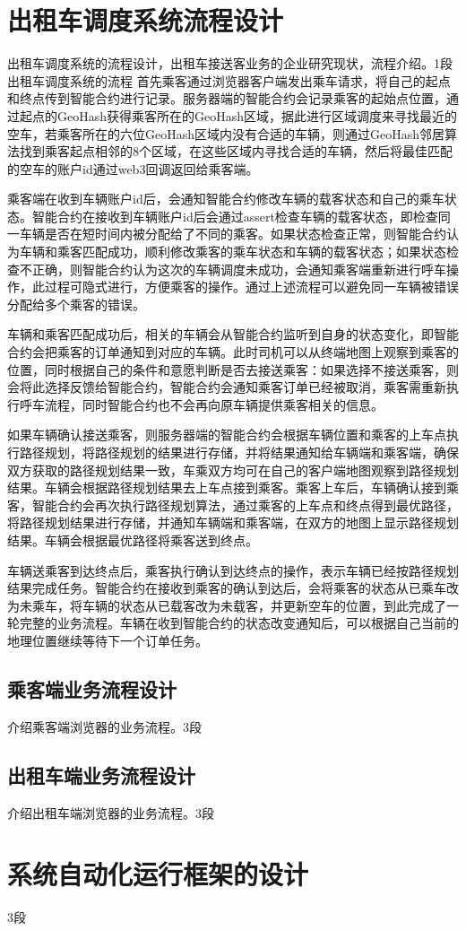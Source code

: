 \section{出租车调度系统流程设计}
出租车调度系统的流程设计，出租车接送客业务的企业研究现状，流程介绍。1段
出租车调度系统的流程
首先乘客通过浏览器客户端发出乘车请求，将自己的起点和终点传到智能合约进行记录。服务器端的智能合约会记录乘客的起始点位置，通过起点的GeoHash获得乘客所在的GeoHash区域，据此进行区域调度来寻找最近的空车，若乘客所在的六位GeoHash区域内没有合适的车辆，则通过GeoHash邻居算法找到乘客起点相邻的8个区域，在这些区域内寻找合适的车辆，然后将最佳匹配的空车的账户id通过web3回调返回给乘客端。

乘客端在收到车辆账户id后，会通知智能合约修改车辆的载客状态和自己的乘车状态。智能合约在接收到车辆账户id后会通过assert检查车辆的载客状态，即检查同一车辆是否在短时间内被分配给了不同的乘客。如果状态检查正常，则智能合约认为车辆和乘客匹配成功，顺利修改乘客的乘车状态和车辆的载客状态；如果状态检查不正确，则智能合约认为这次的车辆调度未成功，会通知乘客端重新进行呼车操作，此过程可隐式进行，方便乘客的操作。通过上述流程可以避免同一车辆被错误分配给多个乘客的错误。

车辆和乘客匹配成功后，相关的车辆会从智能合约监听到自身的状态变化，即智能合约会把乘客的订单通知到对应的车辆。此时司机可以从终端地图上观察到乘客的位置，同时根据自己的条件和意愿判断是否去接送乘客：如果选择不接送乘客，则会将此选择反馈给智能合约，智能合约会通知乘客订单已经被取消，乘客需重新执行呼车流程，同时智能合约也不会再向原车辆提供乘客相关的信息。

如果车辆确认接送乘客，则服务器端的智能合约会根据车辆位置和乘客的上车点执行路径规划，将路径规划的结果进行存储，并将结果通知给车辆端和乘客端，确保双方获取的路径规划结果一致，车乘双方均可在自己的客户端地图观察到路径规划结果。车辆会根据路径规划结果去上车点接到乘客。乘客上车后，车辆确认接到乘客，智能合约会再次执行路径规划算法，通过乘客的上车点和终点得到最优路径，将路径规划结果进行存储，并通知车辆端和乘客端，在双方的地图上显示路径规划结果。车辆会根据最优路径将乘客送到终点。

车辆送乘客到达终点后，乘客执行确认到达终点的操作，表示车辆已经按路径规划结果完成任务。智能合约在接收到乘客的确认到达后，会将乘客的状态从已乘车改为未乘车，将车辆的状态从已载客改为未载客，并更新空车的位置，到此完成了一轮完整的业务流程。车辆在收到智能合约的状态改变通知后，可以根据自己当前的地理位置继续等待下一个订单任务。

\subsection{乘客端业务流程设计}
介绍乘客端浏览器的业务流程。3段
\subsection{出租车端业务流程设计}
介绍出租车端浏览器的业务流程。3段

\section{系统自动化运行框架的设计}
3段